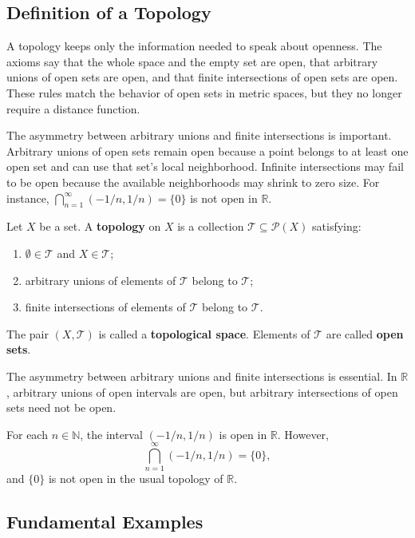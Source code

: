 \subsection{Definition of a Topology}


A topology keeps only the information needed to speak about openness. The axioms say that the whole space and the empty set are open, that arbitrary unions of open sets are open, and that finite intersections of open sets are open. These rules match the behavior of open sets in metric spaces, but they no longer require a distance function.

The asymmetry between arbitrary unions and finite intersections is important. Arbitrary unions of open sets remain open because a point belongs to at least one open set and can use that set's local neighborhood. Infinite intersections may fail to be open because the available neighborhoods may shrink to zero size. For instance, $\bigcap_{n=1}^{\infty}(-1/n,1/n)=\{0\}$ is not open in $\mathbb{R}$.

\begin{definition}[Topology]
Let $X$ be a set. A \textbf{topology} on $X$ is a collection $\mathcal{T}\subseteq\mathcal{P}(X)$ satisfying:
\begin{enumerate}
    \item $\emptyset\in\mathcal{T}$ and $X\in\mathcal{T}$;
    \item arbitrary unions of elements of $\mathcal{T}$ belong to $\mathcal{T}$;
    \item finite intersections of elements of $\mathcal{T}$ belong to $\mathcal{T}$.
\end{enumerate}
The pair $(X,\mathcal{T})$ is called a \textbf{topological space}. Elements of $\mathcal{T}$ are called \textbf{open sets}.
\end{definition}

The asymmetry between arbitrary unions and finite intersections is essential. In $\mathbb{R}$, arbitrary unions of open intervals are open, but arbitrary intersections of open sets need not be open.

\begin{example}
For each $n\in\mathbb{N}$, the interval $(-1/n,1/n)$ is open in $\mathbb{R}$. However,
\[
    \bigcap_{n=1}^{\infty}(-1/n,1/n)=\{0\},
\]
and $\{0\}$ is not open in the usual topology of $\mathbb{R}$.
\end{example}

\subsection{Fundamental Examples}


